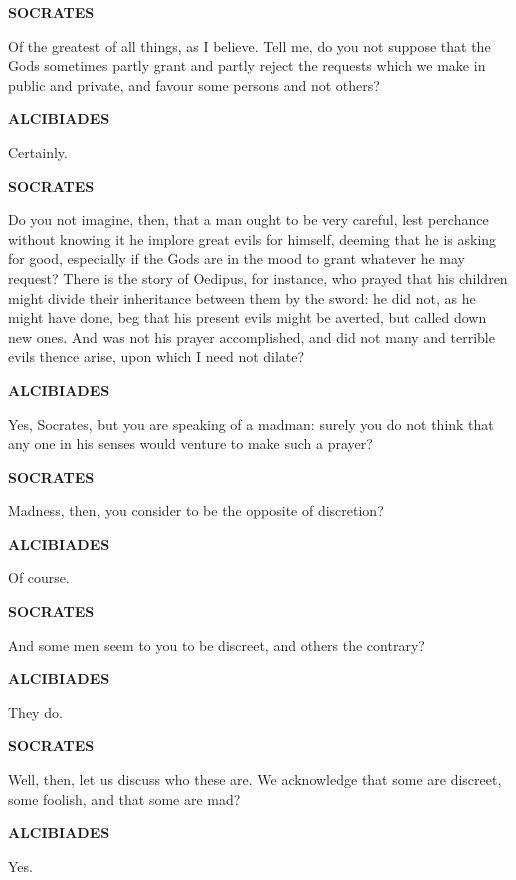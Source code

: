 \documentclass[11pt,letter]{article}
\begin{document}
\par \textbf{SOCRATES}
\par   Of the greatest of all things, as I believe. Tell me, do you not suppose that the Gods sometimes partly grant and partly reject the requests which we make in public and private, and favour some persons and not others?

\par \textbf{ALCIBIADES}
\par   Certainly.

\par \textbf{SOCRATES}
\par   Do you not imagine, then, that a man ought to be very careful, lest perchance without knowing it he implore great evils for himself, deeming that he is asking for good, especially if the Gods are in the mood to grant whatever he may request? There is the story of Oedipus, for instance, who prayed that his children might divide their inheritance between them by the sword:  he did not, as he might have done, beg that his present evils might be averted, but called down new ones. And was not his prayer accomplished, and did not many and terrible evils thence arise, upon which I need not dilate?

\par \textbf{ALCIBIADES}
\par   Yes, Socrates, but you are speaking of a madman:  surely you do not think that any one in his senses would venture to make such a prayer?

\par \textbf{SOCRATES}
\par   Madness, then, you consider to be the opposite of discretion?

\par \textbf{ALCIBIADES}
\par   Of course.

\par \textbf{SOCRATES}
\par   And some men seem to you to be discreet, and others the contrary?

\par \textbf{ALCIBIADES}
\par   They do.

\par \textbf{SOCRATES}
\par   Well, then, let us discuss who these are. We acknowledge that some are discreet, some foolish, and that some are mad?

\par \textbf{ALCIBIADES}
\par   Yes.
\end{document}
